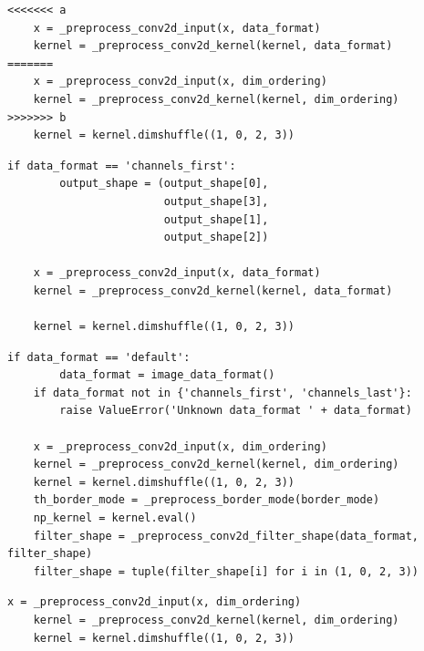 %

\begin{lstlisting}[style=conflictcode,title={\textbf{The conflict} (\texttt{0x96d20e6c9b0f2395})}]
<<<<<<< a
    x = _preprocess_conv2d_input(x, data_format)
    kernel = _preprocess_conv2d_kernel(kernel, data_format)
=======
    x = _preprocess_conv2d_input(x, dim_ordering)
    kernel = _preprocess_conv2d_kernel(kernel, dim_ordering)
>>>>>>> b
    kernel = kernel.dimshuffle((1, 0, 2, 3))
\end{lstlisting}

\begin{lstlisting}[style=conflictcode,title={\textbf{Ground-truth resolution} (10 lines, 359 characters)}]
    if data_format == 'channels_first':
        output_shape = (output_shape[0],
                        output_shape[3],
                        output_shape[1],
                        output_shape[2])

    x = _preprocess_conv2d_input(x, data_format)
    kernel = _preprocess_conv2d_kernel(kernel, data_format)

    kernel = kernel.dimshuffle((1, 0, 2, 3))
\end{lstlisting}

\begin{lstlisting}[style=conflictcode,title={\textbf{Apertus-8B, without the skill} --- edit 0.320, winnowing 0.538, 583 characters}]
if data_format == 'default':
        data_format = image_data_format()
    if data_format not in {'channels_first', 'channels_last'}:
        raise ValueError('Unknown data_format ' + data_format)

    x = _preprocess_conv2d_input(x, dim_ordering)
    kernel = _preprocess_conv2d_kernel(kernel, dim_ordering)
    kernel = kernel.dimshuffle((1, 0, 2, 3))
    th_border_mode = _preprocess_border_mode(border_mode)
    np_kernel = kernel.eval()
    filter_shape = _preprocess_conv2d_filter_shape(data_format, filter_shape)
    filter_shape = tuple(filter_shape[i] for i in (1, 0, 2, 3))
\end{lstlisting}

\begin{lstlisting}[style=conflictcode,title={\textbf{Apertus-8B, with v2 in the system prompt} --- edit 0.454, winnowing 0.539, 151 characters}]
x = _preprocess_conv2d_input(x, dim_ordering)
    kernel = _preprocess_conv2d_kernel(kernel, dim_ordering)
    kernel = kernel.dimshuffle((1, 0, 2, 3))
\end{lstlisting}

